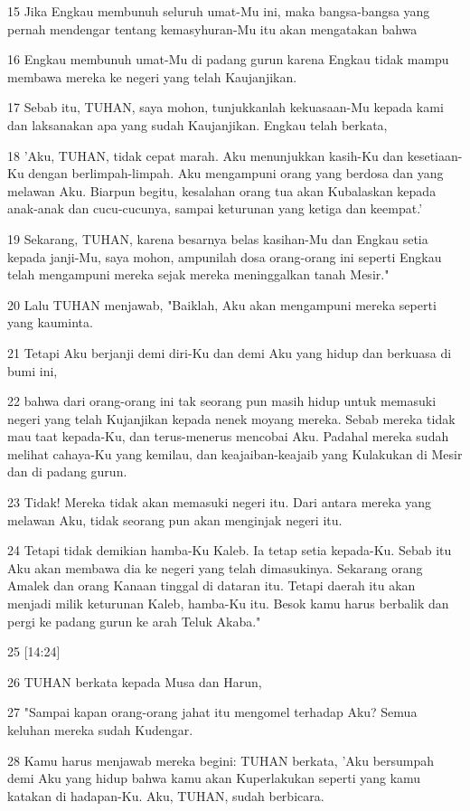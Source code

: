 \par 15 Jika Engkau membunuh seluruh umat-Mu ini, maka bangsa-bangsa yang pernah mendengar tentang kemasyhuran-Mu itu akan mengatakan bahwa
\par 16 Engkau membunuh umat-Mu di padang gurun karena Engkau tidak mampu membawa mereka ke negeri yang telah Kaujanjikan.
\par 17 Sebab itu, TUHAN, saya mohon, tunjukkanlah kekuasaan-Mu kepada kami dan laksanakan apa yang sudah Kaujanjikan. Engkau telah berkata,
\par 18 'Aku, TUHAN, tidak cepat marah. Aku menunjukkan kasih-Ku dan kesetiaan-Ku dengan berlimpah-limpah. Aku mengampuni orang yang berdosa dan yang melawan Aku. Biarpun begitu, kesalahan orang tua akan Kubalaskan kepada anak-anak dan cucu-cucunya, sampai keturunan yang ketiga dan keempat.'
\par 19 Sekarang, TUHAN, karena besarnya belas kasihan-Mu dan Engkau setia kepada janji-Mu, saya mohon, ampunilah dosa orang-orang ini seperti Engkau telah mengampuni mereka sejak mereka meninggalkan tanah Mesir."
\par 20 Lalu TUHAN menjawab, "Baiklah, Aku akan mengampuni mereka seperti yang kauminta.
\par 21 Tetapi Aku berjanji demi diri-Ku dan demi Aku yang hidup dan berkuasa di bumi ini,
\par 22 bahwa dari orang-orang ini tak seorang pun masih hidup untuk memasuki negeri yang telah Kujanjikan kepada nenek moyang mereka. Sebab mereka tidak mau taat kepada-Ku, dan terus-menerus mencobai Aku. Padahal mereka sudah melihat cahaya-Ku yang kemilau, dan keajaiban-keajaib yang Kulakukan di Mesir dan di padang gurun.
\par 23 Tidak! Mereka tidak akan memasuki negeri itu. Dari antara mereka yang melawan Aku, tidak seorang pun akan menginjak negeri itu.
\par 24 Tetapi tidak demikian hamba-Ku Kaleb. Ia tetap setia kepada-Ku. Sebab itu Aku akan membawa dia ke negeri yang telah dimasukinya. Sekarang orang Amalek dan orang Kanaan tinggal di dataran itu. Tetapi daerah itu akan menjadi milik keturunan Kaleb, hamba-Ku itu. Besok kamu harus berbalik dan pergi ke padang gurun ke arah Teluk Akaba."
\par 25 [14:24]
\par 26 TUHAN berkata kepada Musa dan Harun,
\par 27 "Sampai kapan orang-orang jahat itu mengomel terhadap Aku? Semua keluhan mereka sudah Kudengar.
\par 28 Kamu harus menjawab mereka begini: TUHAN berkata, 'Aku bersumpah demi Aku yang hidup bahwa kamu akan Kuperlakukan seperti yang kamu katakan di hadapan-Ku. Aku, TUHAN, sudah berbicara.
